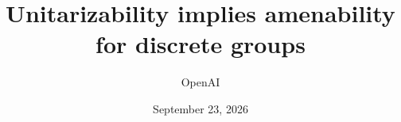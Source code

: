 \documentclass[11pt]{article}
\title{Unitarizability implies amenability for discrete groups}
\author{OpenAI}
\date{September 23, 2026}
\numberwithin{equation}{section}
\theoremstyle{definition}
\begin{document}
\maketitle





\begingroup
\raggedright
\let\standardbibliography\thebibliography
\renewcommand{\thebibliography}[1]{%
  \standardbibliography{#1}\setlength{\itemsep}{3pt}}


\endgroup
\end{document}
